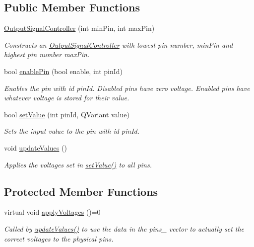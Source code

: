 \subsection*{Public Member Functions}
\begin{DoxyCompactItemize}
\item 
\hyperlink{class_picto_1_1_output_signal_controller_abc833bb04f16765d7955c8171de246a7}{Output\-Signal\-Controller} (int min\-Pin, int max\-Pin)
\begin{DoxyCompactList}\small\item\em Constructs an \hyperlink{class_picto_1_1_output_signal_controller}{Output\-Signal\-Controller} with lowest pin number, min\-Pin and highest pin number max\-Pin. \end{DoxyCompactList}\item 
bool \hyperlink{class_picto_1_1_output_signal_controller_a93eb776d8fdba5d087a5100f7b44c1e2}{enable\-Pin} (bool enable, int pin\-Id)
\begin{DoxyCompactList}\small\item\em Enables the pin with id pin\-Id. Disabled pins have zero voltage. Enabled pins have whatever voltage is stored for their value. \end{DoxyCompactList}\item 
bool \hyperlink{class_picto_1_1_output_signal_controller_a1fd137bd0c6b6af610895f405fb3a476}{set\-Value} (int pin\-Id, Q\-Variant value)
\begin{DoxyCompactList}\small\item\em Sets the input value to the pin with id pin\-Id. \end{DoxyCompactList}\item 
\hypertarget{class_picto_1_1_output_signal_controller_af82b2be89eb2e7ca81f81f9b466d2327}{void \hyperlink{class_picto_1_1_output_signal_controller_af82b2be89eb2e7ca81f81f9b466d2327}{update\-Values} ()}\label{class_picto_1_1_output_signal_controller_af82b2be89eb2e7ca81f81f9b466d2327}

\begin{DoxyCompactList}\small\item\em Applies the voltages set in \hyperlink{class_picto_1_1_output_signal_controller_a1fd137bd0c6b6af610895f405fb3a476}{set\-Value()} to all pins. \end{DoxyCompactList}\end{DoxyCompactItemize}
\subsection*{Protected Member Functions}
\begin{DoxyCompactItemize}
\item 
virtual void \hyperlink{class_picto_1_1_output_signal_controller_a8b320e17548cc1fa5d5b9c577aac2882}{apply\-Voltages} ()=0
\begin{DoxyCompactList}\small\item\em Called by \hyperlink{class_picto_1_1_output_signal_controller_af82b2be89eb2e7ca81f81f9b466d2327}{update\-Values()} to use the data in the pins\-\_\- vector to actually set the correct voltages to the physical pins. \end{DoxyCompactList}\end{DoxyCompactItemize}

